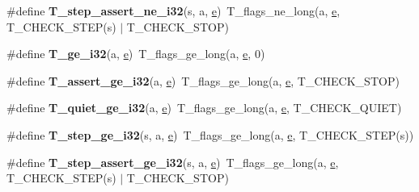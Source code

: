 \begin{DoxyCompactItemize}
\#define {\bfseries T\+\_\+step\+\_\+assert\+\_\+ne\+\_\+i32}(s,  a,  \mbox{\hyperlink{sun4u_2tte_8h_a8b0b9ed08e0e18920ec2682f48228c27}{e}})~T\+\_\+flags\+\_\+ne\+\_\+long(a, \mbox{\hyperlink{sun4u_2tte_8h_a8b0b9ed08e0e18920ec2682f48228c27}{e}}, T\+\_\+\+C\+H\+E\+C\+K\+\_\+\+S\+T\+EP(s) $\vert$ T\+\_\+\+C\+H\+E\+C\+K\+\_\+\+S\+T\+OP)
\item 
\mbox{\label{group__RTEMSTestFrameworkChecksInt32_gaf03f3b505ed56e482d4c676dbadb3305}} 
\#define {\bfseries T\+\_\+ge\+\_\+i32}(a,  \mbox{\hyperlink{sun4u_2tte_8h_a8b0b9ed08e0e18920ec2682f48228c27}{e}})~T\+\_\+flags\+\_\+ge\+\_\+long(a, \mbox{\hyperlink{sun4u_2tte_8h_a8b0b9ed08e0e18920ec2682f48228c27}{e}}, 0)
\item 
\mbox{\label{group__RTEMSTestFrameworkChecksInt32_ga87bd2e4efe294899f6edbcace405c22d}} 
\#define {\bfseries T\+\_\+assert\+\_\+ge\+\_\+i32}(a,  \mbox{\hyperlink{sun4u_2tte_8h_a8b0b9ed08e0e18920ec2682f48228c27}{e}})~T\+\_\+flags\+\_\+ge\+\_\+long(a, \mbox{\hyperlink{sun4u_2tte_8h_a8b0b9ed08e0e18920ec2682f48228c27}{e}}, T\+\_\+\+C\+H\+E\+C\+K\+\_\+\+S\+T\+OP)
\item 
\mbox{\label{group__RTEMSTestFrameworkChecksInt32_ga6bfff716017602359f37c8269e4adaa6}} 
\#define {\bfseries T\+\_\+quiet\+\_\+ge\+\_\+i32}(a,  \mbox{\hyperlink{sun4u_2tte_8h_a8b0b9ed08e0e18920ec2682f48228c27}{e}})~T\+\_\+flags\+\_\+ge\+\_\+long(a, \mbox{\hyperlink{sun4u_2tte_8h_a8b0b9ed08e0e18920ec2682f48228c27}{e}}, T\+\_\+\+C\+H\+E\+C\+K\+\_\+\+Q\+U\+I\+ET)
\item 
\mbox{\label{group__RTEMSTestFrameworkChecksInt32_gad5e1c4f70926702a6f567d3ff052cc72}} 
\#define {\bfseries T\+\_\+step\+\_\+ge\+\_\+i32}(s,  a,  \mbox{\hyperlink{sun4u_2tte_8h_a8b0b9ed08e0e18920ec2682f48228c27}{e}})~T\+\_\+flags\+\_\+ge\+\_\+long(a, \mbox{\hyperlink{sun4u_2tte_8h_a8b0b9ed08e0e18920ec2682f48228c27}{e}}, T\+\_\+\+C\+H\+E\+C\+K\+\_\+\+S\+T\+EP(s))
\item 
\mbox{\label{group__RTEMSTestFrameworkChecksInt32_ga51a2f71f861909a1f17a0e967083d82a}} 
\#define {\bfseries T\+\_\+step\+\_\+assert\+\_\+ge\+\_\+i32}(s,  a,  \mbox{\hyperlink{sun4u_2tte_8h_a8b0b9ed08e0e18920ec2682f48228c27}{e}})~T\+\_\+flags\+\_\+ge\+\_\+long(a, \mbox{\hyperlink{sun4u_2tte_8h_a8b0b9ed08e0e18920ec2682f48228c27}{e}}, T\+\_\+\+C\+H\+E\+C\+K\+\_\+\+S\+T\+EP(s) $\vert$ T\+\_\+\+C\+H\+E\+C\+K\+\_\+\+S\+T\+OP)

\end{DoxyCompactItemize}
